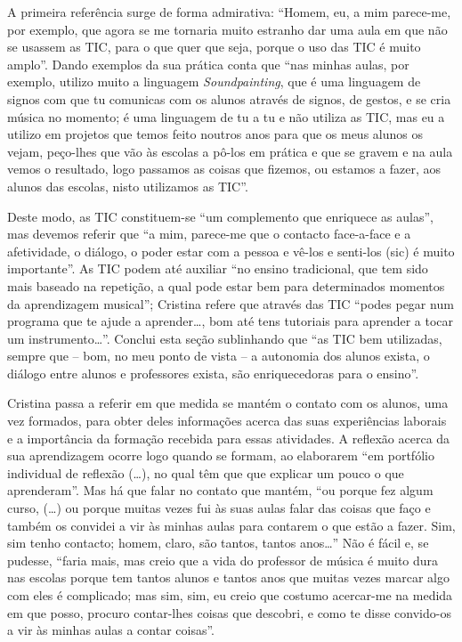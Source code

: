 \documentclass{textolivre}
\begin{document}
A primeira referência surge de forma admirativa: “Homem, eu, a mim parece-me,
por exemplo, que agora se me tornaria muito estranho dar uma aula em que não se
usassem as TIC, para o que quer que seja, porque o uso das TIC é muito amplo”.
Dando exemplos da sua prática conta que “nas minhas aulas, por exemplo, utilizo
muito a linguagem \textit{Soundpainting}, que é uma linguagem de signos com que
tu comunicas com os alunos através de signos, de gestos, e se cria música no
momento; é uma linguagem de tu a tu e não utiliza as TIC, mas eu a utilizo em
projetos que temos feito noutros anos para que os meus alunos os vejam,
peço-lhes que vão às escolas a pô-los em prática e que se gravem e na aula
vemos o resultado, logo passamos as coisas que fizemos, ou estamos a fazer, aos
alunos das escolas, nisto utilizamos as TIC”.

Deste modo, as TIC constituem-se “um complemento que enriquece as aulas”, mas
devemos referir que “a mim, parece-me que o contacto face-a-face e a
afetividade, o diálogo, o poder estar com a pessoa e vê-los e senti-los (sic) é
muito importante”. As TIC podem até auxiliar “no ensino tradicional, que tem
sido mais baseado na repetição, a qual pode estar bem para determinados
momentos da aprendizagem musical”; Cristina refere que através das TIC “podes
pegar num programa que te ajude a aprender\ldots, bom até tens tutoriais para
aprender a tocar um instrumento\ldots”. Conclui esta seção sublinhando que “as
TIC bem utilizadas, sempre que – bom, no meu ponto de vista – a autonomia dos
alunos exista, o diálogo entre alunos e professores exista, são enriquecedoras
para o ensino”.

Cristina passa a referir em que medida se mantém o contato com os alunos, uma
vez formados, para obter deles informações acerca das suas experiências
laborais e a importância da formação recebida para essas atividades. A reflexão
acerca da sua aprendizagem ocorre logo quando se formam, ao elaborarem “em
portfólio individual de reflexão (\ldots), no qual têm que que explicar um
pouco o que aprenderam”. Mas há que falar no contato que mantém, “ou porque fez
algum curso, (\ldots) ou porque muitas vezes fui às suas aulas falar das coisas
que faço e também os convidei a vir às minhas aulas para contarem o que estão a
fazer. Sim, sim tenho contacto; homem, claro, são tantos, tantos anos\ldots”
Não é fácil e, se pudesse, “faria mais, mas creio que a vida do professor de
música é muito dura nas escolas porque tem tantos alunos e tantos anos que
muitas vezes marcar algo com eles é complicado; mas sim, sim, eu creio que
costumo acercar-me na medida em que posso, procuro contar-lhes coisas que
descobri, e como te disse convido-os a vir às minhas aulas a contar coisas”.
\end{document}

